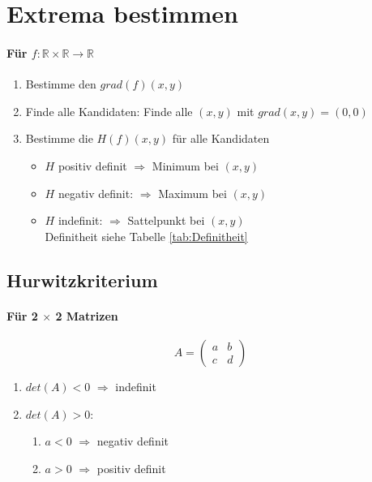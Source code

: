 \documentclass{article} %
\newcommand{\R}[0]{\mathbb{R}}
\newcommand{\Ra}[0]{\Rightarrow}
\newcommand{\ram}[0]{$\Ra$ }
\begin{document}
\section{Extrema bestimmen}
\paragraph{Für $f: \R \times \R \rightarrow \R$}
\begin{enumerate}
    \item Bestimme den  $grad(f)(x,y)$
    \item Finde alle Kandidaten: Finde alle $(x,y)$ mit $grad(x,y) = (0,0)$
    \item Bestimme die  $H(f)(x,y)$ für alle Kandidaten
    \begin{itemize}
        \item $H$ positiv definit $\Ra$ Minimum bei $(x,y)$
        \item $H$ negativ definit: $\Ra$ Maximum bei $(x,y)$
        \item $H$ indefinit: $\Ra$ Sattelpunkt bei $(x,y)$ \\ Definitheit siehe Tabelle \ref{tab:Definitheit} %
    \end{itemize}
\end{enumerate}
\subsection{Hurwitzkriterium}
\paragraph{Für 2 $\times$ 2 Matrizen}
\[
A = \begin{pmatrix}
a & b \\  c & d
\end{pmatrix}
\]
\begin{enumerate}
    \item $det(A) < 0$ \ram indefinit
    \item $det(A) > 0$: 
    \begin{enumerate}
        \item $a < 0$ \ram negativ definit
        \item $a > 0$ \ram positiv definit
    \end{enumerate}
\end{enumerate}
\end{document}
